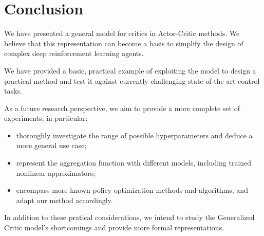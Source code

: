 \section{Conclusion}
\label{sec:conc}
We have presented a general model for critics in Actor-Critic methods. We believe that this representation can become a basis to simplify the design of complex deep reinforcement learning agents.

We have provided a basic, practical example of exploiting the model to design a practical method and test it against currently challenging state-of-the-art control tasks.

As a future research perspective, we aim to provide a more complete set of experiments, in particular: 
\begin{itemize}
\item thoroughly investigate the range of possible hyperparameters and deduce a more general use case;
\item represent the aggregation function with different models, including trained nonlinear approximators;
\item encompass more known policy optimization methods and algorithms, and adapt our method accordingly.
\end{itemize}

In addition to these pratical considerations, we intend to study the Generalized Critic model's shortcomings and provide more formal representations.



